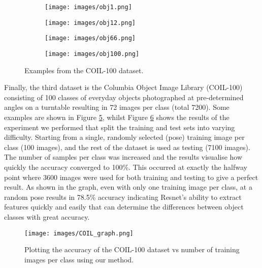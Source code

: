 \documentclass[conference]{IEEEtran}
\begin{document}
\begin{figure}[ht]
	\centering
	\begin{subfigure}{0.45\linewidth}
		\centering
		\texttt{[image: images/obj1.png]}
		\caption{}
		\label{fig:coil1}
	\end{subfigure}%
	\begin{subfigure}{0.45\linewidth}
		\centering
		\texttt{[image: images/obj12.png]}
		\caption{}
		\label{fig:coil2}
	\end{subfigure}%
	
	\begin{subfigure}{0.45\linewidth}
		\centering
		\texttt{[image: images/obj66.png]}
		\caption{}
		\label{fig:coil3}
	\end{subfigure}%
	\begin{subfigure}{0.45\linewidth}
		\centering
		\texttt{[image: images/obj100.png]}
		\caption{}
		\label{fig:coil4}
	\end{subfigure}%
	
	\caption{Examples from the COIL-100 dataset.}
	\label{fig:coil_images}
\end{figure}



Finally, the third dataset is the Columbia Object Image Library (COIL-100) consisting of 100 classes of everyday objects photographed at pre-determined angles on a turntable resulting in 72 images per class (total 7200). Some examples are shown in Figure \ref{fig:coil_images}, whilst Figure \ref{fig:coil_plot} shows the results of the experiment we performed that split the training and test sets into varying difficulty. Starting from a single, randomly selected (pose) training image per class (100 images), and the rest of the dataset is used as testing (7100 images). The number of samples per class was increased and the results visualise how quickly the accuracy converged to 100\%. This occurred at exactly the halfway point where 3600 images were used for both training and testing to give a perfect result. As shown in the graph, even with only one training image per class, at a random pose results in 78.5\% accuracy indicating Resnet's ability to extract features quickly and easily that can determine the differences between object classes with great accuracy. 



\begin{figure}
	\centering
	\texttt{[image: images/COIL\_graph.png]}
	\caption{Plotting the accuracy of the COIL-100 dataset vs number of training images per class using our method.}
	\label{fig:coil_plot}
\end{figure}
\end{document}
